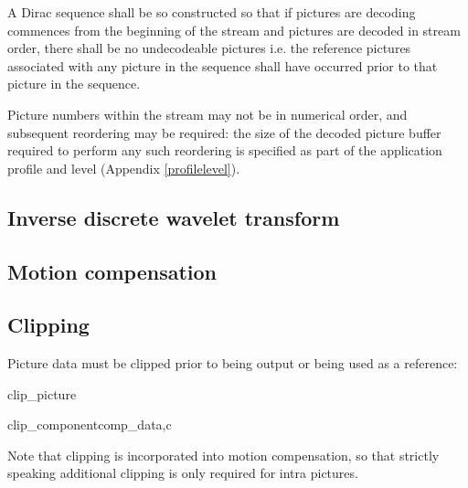 A Dirac sequence shall be so constructed so that if
pictures are decoding commences from the beginning of the stream and pictures are decoded in 
stream order, there shall be no undecodeable pictures i.e. the reference pictures associated with
any picture in the sequence shall have occurred prior to that picture in the sequence.

Picture numbers within the stream may not be in numerical order, and subsequent reordering may be
required: the size of the decoded picture buffer required to perform any such reordering is specified
as part of the application profile and level (Appendix \ref{profilelevel}).

\subsection{Inverse discrete wavelet transform}


\subsection{Motion compensation}


\subsection{Clipping}
\label{pictureclip}

Picture data must be clipped prior to being output or being
used as a reference:

\begin{pseudo}{clip\_picture}{}
\bsEND
\end{pseudo}


\begin{pseudo}{clip\_component}{comp\_data,c}
    \bsCODE{\BitDepth=\LumaDepth}
\bsELSE
    \bsCODE{\BitDepth=\ChromaDepth}
\bsEND
{}
     \bsEND
\bsEND
\end{pseudo}

\begin{informative}
Note that clipping is incorporated into motion compensation, so that strictly speaking additional
clipping is only required for intra pictures.
\end{informative}